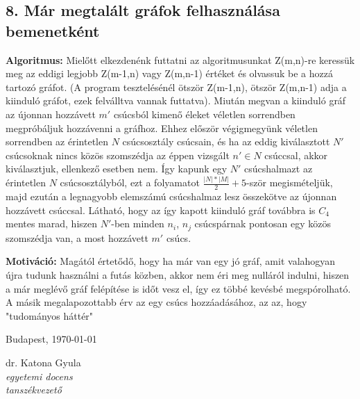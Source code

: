 \documentclass[12pt,a4paper]{article}
\begin{document}
\subsection*{8. Már megtalált gráfok felhasználása bemenetként}
\textbf{Algoritmus:} Mielőtt elkezdenénk futtatni az algoritmusunkat Z(m,n)-re keressük meg az eddigi legjobb Z(m-1,n) vagy Z(m,n-1) értéket és olvassuk be a hozzá tartozó gráfot. (A program tesztelésénél ötször Z(m-1,n), ötször Z(m,n-1) adja a kiinduló gráfot, ezek felválltva vannak futtatva). Miután megvan a kiinduló gráf az újonnan hozzávett $m'$ csúcsból kimenő éleket véletlen sorrendben megpróbáljuk hozzávenni a gráfhoz. Ehhez először végigmegyünk véletlen sorrendben az érintetlen $N$ csúcsosztály csúcsain, és ha az eddig kiválasztott $N'$ csúcsoknak nincs közös szomszédja az éppen vizsgált $n' \in N$ csúccsal, akkor kiválasztjuk, ellenkező esetben nem.  Így kapunk egy $N'$ csúcshalmazt az érintetlen $N$ csúcsosztályból, ezt a folyamatot $\tfrac{|N|*|M|}{2}+5$-ször megismételjük, majd ezután a legnagyobb elemszámú csúcshalmaz lesz összekötve az újonnan hozzávett csúccsal. Látható, hogy az így kapott kiinduló gráf továbbra is $C_4$ mentes marad, hiszen $N'$-ben minden $n_i$, $n_j$ csúcspárnak pontosan egy közös szomszédja van, a most hozzávett $m'$ csúcs.

\textbf{Motiváció:} Magától értetődő, hogy ha már van egy jó gráf, amit valahogyan újra tudunk használni a futás közben, akkor nem éri meg nulláról indulni, hiszen a már meglévő gráf felépítése is időt vesz el, így ez többé kevésbé megspórolható. A másik megalapozottabb érv az egy csúcs hozzáadásához, az az, hogy "tudományos háttér" 

\vspace{1cm}\vfill
Budapest, \today
\begin{flushright}
\begin{minipage}{0.5\textwidth}
\begin{center}
	dr. Katona Gyula\\
	\textit{egyetemi docens}\\
	\textit{tanszékvezető}
\end{center}
\end{minipage}
\end{flushright}
\vfill
\end{document}

